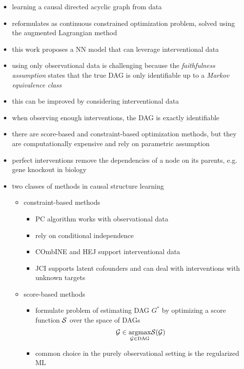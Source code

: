 \begin{itemize}
  \item learning a causal directed acyclic graph from data
  \item reformulates as continuous constrained optimization problem, solved using the augmented Lagrangian method
  \item this work proposes a NN model that can leverage interventional data
  \item using only observational data is challenging because the \textit{faithfulness assumption} states that the true DAG is only identifiable up to a \textit{Markov equivalence class}
  \item this can be improved by considering interventional data
  \item when observing enough interventions, the DAG is exactly identifiable
  \item there are score-based and constraint-based optimization methods, but they are computationally expensive and rely on parametric assumption
  \item perfect interventions remove the dependencies of a node on its parents, e.g. gene knockout in biology
  \item two classes of methods in causal structure learning
  \begin{itemize}
    \item constraint-based methods
    \begin{itemize}
      \item PC algorithm works with observational data
      \item rely on conditional independence
      \item COmbINE and HEJ support interventional data
      \item JCI supports latent cofounders and can deal with interventions with unknown targets
    \end{itemize}
    \item score-based methods
    \begin{itemize}
      \item formulate problem of estimating DAG $G^{*}$ by optimizing a score function $\mathcal{S}$ over the space of DAGs
      \begin{equation*}
        \mathcal{G} \in \underset{\mathcal{G}\in \text{DAG}}{\text{argmax}} \mathcal{S}(\mathcal{G})
      \end{equation*}
      \item common choice in the purely observational setting is the regularized ML

\end{itemize}
\end{itemize}
\end{itemize}
